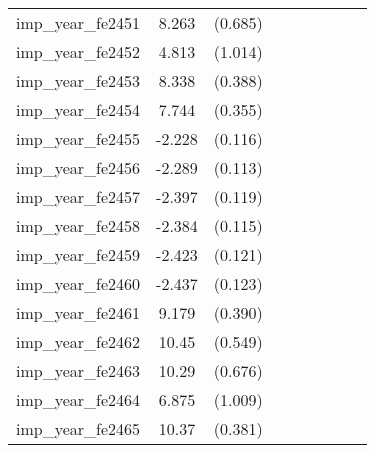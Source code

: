 {\begin{tabular}{l*{4}{cc}}
imp\_year\_fe2451&    8.263\sym{***}&  (0.685)&                  &         &                  &         &                  &         \\
imp\_year\_fe2452&    4.813\sym{***}&  (1.014)&                  &         &                  &         &                  &         \\
imp\_year\_fe2453&    8.338\sym{***}&  (0.388)&                  &         &                  &         &                  &         \\
imp\_year\_fe2454&    7.744\sym{***}&  (0.355)&                  &         &                  &         &                  &         \\
imp\_year\_fe2455&   -2.228\sym{***}&  (0.116)&                  &         &                  &         &                  &         \\
imp\_year\_fe2456&   -2.289\sym{***}&  (0.113)&                  &         &                  &         &                  &         \\
imp\_year\_fe2457&   -2.397\sym{***}&  (0.119)&                  &         &                  &         &                  &         \\
imp\_year\_fe2458&   -2.384\sym{***}&  (0.115)&                  &         &                  &         &                  &         \\
imp\_year\_fe2459&   -2.423\sym{***}&  (0.121)&                  &         &                  &         &                  &         \\
imp\_year\_fe2460&   -2.437\sym{***}&  (0.123)&                  &         &                  &         &                  &         \\
imp\_year\_fe2461&    9.179\sym{***}&  (0.390)&                  &         &                  &         &                  &         \\
imp\_year\_fe2462&    10.45\sym{***}&  (0.549)&                  &         &                  &         &                  &         \\
imp\_year\_fe2463&    10.29\sym{***}&  (0.676)&                  &         &                  &         &                  &         \\
imp\_year\_fe2464&    6.875\sym{***}&  (1.009)&                  &         &                  &         &                  &         \\
imp\_year\_fe2465&    10.37\sym{***}&  (0.381)&                  &         &                  &         &                  &         \\

\end{tabular}}
